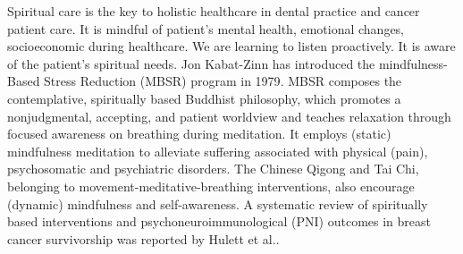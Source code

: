 \documentclass[12pt, a4paper]{article}
\begin{document}
Spiritual care is the key to holistic healthcare in dental practice\citep{Ling-ChengMong2021} and cancer patient care\citep{Hulett2016}. 
It is mindful of patient's mental health, emotional changes, socioeconomic during healthcare.  %
We are learning to listen proactively.
It is aware of the patient's spiritual needs.
Jon Kabat-Zinn has introduced the mindfulness-Based Stress Reduction (MBSR) program in 1979\citep{Niazi2011}. MBSR composes the contemplative, spiritually based Buddhist philosophy, which promotes a nonjudgmental, accepting, and patient worldview and teaches relaxation through focused awareness on breathing during meditation. It employs (static) mindfulness meditation to alleviate suffering associated with physical (pain), psychosomatic and psychiatric disorders.
The Chinese Qigong and Tai Chi, belonging to movement-meditative-breathing interventions, also encourage (dynamic) mindfulness and self-awareness. 
A systematic review of spiritually based interventions and psychoneuroimmunological (PNI) outcomes in breast cancer survivorship was reported by Hulett et al.\citep{Hulett2016}. 
\end{document}
